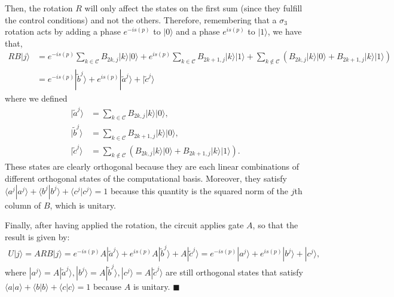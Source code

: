 \documentclass[10pt,letterpaper]{article} %
\begin{document}
Then, the rotation $R$ will only affect the states on the first sum (since they fulfill the control conditions)
and not the others. Therefore,  
remembering that a $\sigma_3$ rotation acts by adding a phase $e^{-is(p)}$ to $|0\rangle$
and a phase $e^{is(p)}$ to $|1\rangle$, we have that,
\begin{align}
RB|j\rangle& = e^{-is(p)} \sum_{k \in \mathcal{C}} B_{2k,j} |k\rangle |0\rangle + e^{is(p)} \sum_{k \in \mathcal{C}} B_{2k+1,j} |k\rangle |1\rangle 
+ \sum_{k \not\in \mathcal{C}} \left( B_{2k,j} |k\rangle|0\rangle  + B_{2k+1,j} |k \rangle |1\rangle  \right) \nonumber \\
& = e^{-is(p)} |\tilde{b}^{j}\rangle + e^{is(p)} |\tilde{a}^j\rangle + |\tilde{c}^j\rangle
\end{align}
where we defined
\begin{align*}
|\tilde{a}^j \rangle &= \sum_{k \in \mathcal{C}} B_{2k,j}|k\rangle|0\rangle,\\
|\tilde{b}^j\rangle &= \sum_{k \in \mathcal{C}} B_{2k+1,j} |k\rangle |0 \rangle,\\
|\tilde{c}^j\rangle &= \sum_{k \not\in \mathcal{C}}\left( B_{2k,j} |k\rangle|0\rangle+ B_{2k+1,j} |k \rangle |1\rangle  \right).
\end{align*}
These states are clearly orthogonal because they are each linear combinations of different 
orthogonal states of the computational basis. 
Moreover, they satisfy  $\langle a^j| a^j\rangle + \langle b^j| b^j\rangle + \langle c^j| c^j\rangle = 1$ because this quantity is the squared norm of the $j$th column of $B$, 
which is unitary.

Finally, after having applied the rotation, the circuit applies gate $A$, 
so that the result is given by:
\begin{eqnarray}
U|j\rangle = ARB|j\rangle = e^{-is(p)} A |\tilde{a}^j\rangle + e^{is(p)} A |\tilde{b}^j\rangle + A |\tilde{c}^j\rangle = e^{-is(p)} |a^j\rangle + e^{is(p)} |b^j\rangle + |c^j\rangle,
\end{eqnarray}
where $|a^j\rangle = A |\tilde{a}^j\rangle, |b^j\rangle = A |\tilde{b}^j\rangle, |c^j\rangle = A |\tilde{c}^j\rangle$ are still orthogonal
states that satisfy $\langle a| a\rangle + \langle b| b\rangle + \langle c| c\rangle = 1$ because $A$ is unitary. $\blacksquare$  \\
 $\;$ \\
\end{document}
